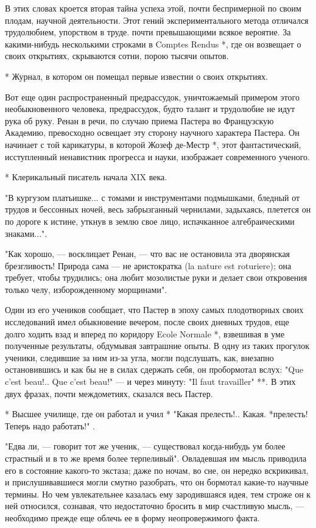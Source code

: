 В этих словах кроется вторая  тайна успеха этой, почти беспримерной по
своим  плодам,  научной  деятельности. Этот  гений  экспериментального
метода отличался  трудолюбием, упорством  в труде.  почти превышающими
всякое  вероятие.  За  какими-нибудь несколькими  строками  в  Comptes
Rendus *, где он возвещает  о своих открытиях, скрываются сотни, порою
тысячи опытов.

* Журнал, в котором он помещал первые известии о своих открытиях.

Вот  еще  один  распространенный предрассудок,  уничтожаемый  примером
этого   необыкновенного  человека,   предрассудок,   будто  талант   и
трудолюбие  не идут  рука  об руку.  Ренан в  речи,  по случаю  приема
Пастера  во Французскую  Академию,  превосходно  освещает эту  сторону
научного характера  Пастера. Он начинает  с той карикатуры,  в которой
Жозеф  де-Местр  *,   этот  фантастический,  исступленный  ненавистник
прогресса и науки, изображает современного ученого.

* Клерикальный писатель начала XIX века.

"В кургузом платьишке... с  томами и инструментами подмышками, бледный
от трудов  и бессонных ночей, весь  забрызганный чернилами, задыхаясь,
плетется он по дороге к истине,  уткнув в землю свое лицо, испачканное
алгебраическими знаками...".

"Как  хорошо, ---  восклицает Ренан,  ---  что вас  не остановила  эта
дворянская брезгливость!  Природа сама --- не  аристократка (la nature
est  roturiere); она  требует, чтобы  трудились; она  любит мозолистые
руки и делает свои откровения только челу, изборожденному морщинами".

Один из его  учеников сообщает, что Пастер в  эпоху самых плодотворных
своих  исследований  имел  обыкновение вечером,  после  своих  дневных
трудов, еще  долго ходить взад и  вперед по коридору Ecole  Normale *,
взвешивая в  уме полученные результаты, обдумывая  завтрашние опыты. В
одну из  таких прогулок  ученики, следившие за  ним из-за  угла, могли
подслушать, как, внезапно  остановившись и как бы не  в силах сдержать
себя, он пробормотал вслух: "Que c'est  beau!.. Que c'est beau!" --- и
через  минуту: "Il  faut travailler"  **.  В этих  двух фразах,  почти
междометиях, сказался весь Пастер.

* Высшее училище,  где он работал  и учил * "Какая  прелесть!.. Какая.
*прелесть! Теперь надо работать!"                                    .

"Едва ли, ---  говорит тот же ученик, ---  существовал когда-нибудь ум
более страстный и в то же время более терпеливый". Овладевшая им мысль
приводила его в состояние какого-то экстаза; даже по ночам, во сне, он
нередко вскрикивал, и прислушивавшиеся  могли смутно разобрать, что он
бормотал какие-то  научные термины. Но чем  увлекательнее казалась ему
зародившаяся  идея,  тем строже  он  к  ней относился,  сознавая,  что
недостаточно бросить в мир счастливую мысль, --- необходимо прежде еще
облечь ее в форму неопровержимого факта.

